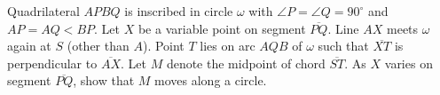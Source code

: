 Quadrilateral $APBQ$ is inscribed in circle $\omega$ with $\angle P = \angle Q = 90^{\circ}$ and $AP = AQ < BP$. Let $X$ be a variable point on segment $\overline{PQ}$. Line $AX$ meets $\omega$ again at $S$ (other than $A$). Point $T$ lies on arc $AQB$ of $\omega$ such that $\overline{XT}$ is perpendicular to $\overline{AX}$. Let $M$ denote the midpoint of chord $\overline{ST}$. As $X$ varies on segment $\overline{PQ}$, show that $M$ moves along a circle.